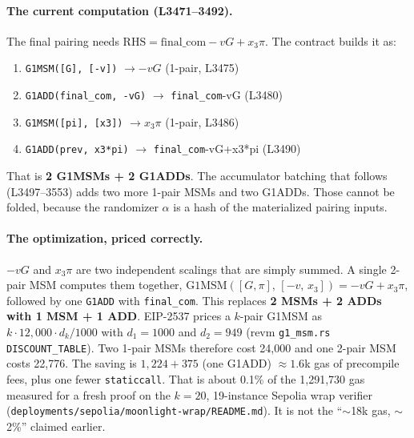 \paragraph{The current computation (L3471--3492).}
The final pairing needs $\text{RHS} = \text{final\_com} - vG +
x_3\pi$. The contract builds it as:
\begin{enumerate}[leftmargin=1.6em,itemsep=2pt]
\item \texttt{G1MSM([G], [-v])} $\to -vG$ \hfill (1-pair, L3475)
\item \texttt{G1ADD(final\_\allowbreak{}com, -vG)} $\to$ \texttt{final\_com}-vG (L3480)
\item \texttt{G1MSM([pi], [x3])} $\to x_3\pi$ \hfill (1-pair, L3486)
\item \texttt{G1ADD(prev, x3*pi)} $\to$ \texttt{final\_com}-vG+x3*pi (L3490)
\end{enumerate}
That is \textbf{2 G1MSMs + 2 G1ADDs}. The accumulator batching
that follows (L3497--3553) adds two more 1-pair MSMs and two
G1ADDs. Those cannot be folded, because the randomizer $\alpha$ is
a hash of the materialized pairing inputs.

\paragraph{The optimization, priced correctly.}
$-vG$ and $x_3\pi$ are two independent scalings that are simply
summed. A single 2-pair MSM computes them together,
$\text{G1MSM}([G,\pi],\,[-v,\,x_3]) = -vG + x_3\pi$, followed by one
\texttt{G1ADD} with \texttt{final\_com}. This replaces
\textbf{2 MSMs + 2 ADDs with 1 MSM + 1 ADD}. EIP-2537 prices a
$k$-pair G1MSM as $k\cdot12{,}000\cdot d_k/1000$ with
$d_1=1000$ and $d_2=949$ (revm \texttt{g1\_msm.rs}
\texttt{DISCOUNT\_TABLE}). Two 1-pair MSMs therefore cost 24{,}000
and one 2-pair MSM costs 22{,}776. The saving is
$1{,}224+375$ (one G1ADD) $\approx1.6$k gas of precompile fees, plus
one fewer \texttt{staticcall}. That is about 0.1\% of the
1{,}291{,}730 gas measured for a fresh proof on the $k=20$,
19-instance Sepolia wrap verifier (\texttt{deployments/\allowbreak{}sepolia/\allowbreak{}moonlight-wrap/\allowbreak{}README.md}).
It is not the ``$\sim$18k gas, $\sim$2\%'' claimed earlier.

